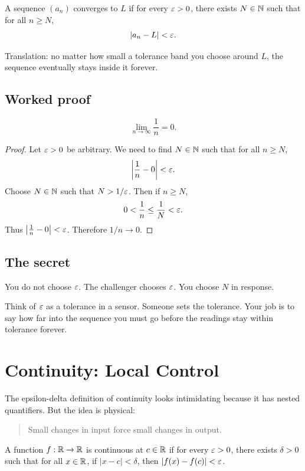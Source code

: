 \documentclass[11pt]{article}
\begin{document}
\begin{definition}
A sequence $(a_n)$ converges to $L$ if for every $\varepsilon>0$, there exists $N\in\mathbb{N}$ such that for all $n\geq N$,
\[
|a_n-L|<\varepsilon.
\]
\end{definition}

Translation: no matter how small a tolerance band you choose around $L$, the sequence eventually stays inside it forever.

\subsection{Worked proof}

\begin{theorem}
\[
\lim_{n\to\infty}\frac1n=0.
\]
\end{theorem}

\begin{proof}
Let $\varepsilon>0$ be arbitrary. We need to find $N\in\mathbb{N}$ such that for all $n\geq N$,
\[
\left|\frac1n-0\right|<\varepsilon.
\]
Choose $N\in\mathbb{N}$ such that $N>1/\varepsilon$. Then if $n\geq N$,
\[
0<\frac1n\leq\frac1N<\varepsilon.
\]
Thus $\left|\frac1n-0\right|<\varepsilon$. Therefore $1/n\to0$.
\end{proof}

\subsection{The secret}

You do not choose $\varepsilon$. The challenger chooses $\varepsilon$. You choose $N$ in response.

\begin{walkbox}
Think of $\varepsilon$ as a tolerance in a sensor. Someone sets the tolerance. Your job is to say how far into the sequence you must go before the readings stay within tolerance forever.
\end{walkbox}

\newpage
\section{Continuity: Local Control}

The epsilon-delta definition of continuity looks intimidating because it has nested quantifiers. But the idea is physical:

\begin{quote}
Small changes in input force small changes in output.
\end{quote}

\begin{definition}
A function $f:\mathbb{R}\to\mathbb{R}$ is continuous at $c\in\mathbb{R}$ if for every $\varepsilon>0$, there exists $\delta>0$ such that for all $x\in\mathbb{R}$, if $|x-c|<\delta$, then $|f(x)-f(c)|<\varepsilon$.
\end{definition}
\end{document}
